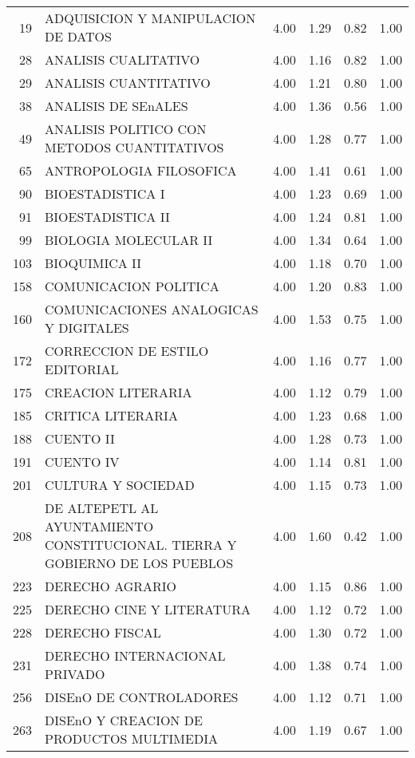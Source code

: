 \documentclass[12pt]{article}
\begin{document}
\begin{table}[ht]
\begin{tabular}{rlrrrr}
  19 & ADQUISICION Y MANIPULACION DE DATOS & 4.00 & 1.29 & 0.82 & 1.00 \\ 
  28 & ANALISIS CUALITATIVO & 4.00 & 1.16 & 0.82 & 1.00 \\ 
  29 & ANALISIS CUANTITATIVO & 4.00 & 1.21 & 0.80 & 1.00 \\ 
  38 & ANALISIS DE SEnALES & 4.00 & 1.36 & 0.56 & 1.00 \\ 
  49 & ANALISIS POLITICO CON METODOS CUANTITATIVOS & 4.00 & 1.28 & 0.77 & 1.00 \\ 
  65 & ANTROPOLOGIA FILOSOFICA & 4.00 & 1.41 & 0.61 & 1.00 \\ 
  90 & BIOESTADISTICA I & 4.00 & 1.23 & 0.69 & 1.00 \\ 
  91 & BIOESTADISTICA II & 4.00 & 1.24 & 0.81 & 1.00 \\ 
  99 & BIOLOGIA MOLECULAR II & 4.00 & 1.34 & 0.64 & 1.00 \\ 
  103 & BIOQUIMICA II & 4.00 & 1.18 & 0.70 & 1.00 \\ 
  158 & COMUNICACION POLITICA & 4.00 & 1.20 & 0.83 & 1.00 \\ 
  160 & COMUNICACIONES ANALOGICAS Y DIGITALES & 4.00 & 1.53 & 0.75 & 1.00 \\ 
  172 & CORRECCION DE ESTILO EDITORIAL & 4.00 & 1.16 & 0.77 & 1.00 \\ 
  175 & CREACION LITERARIA & 4.00 & 1.12 & 0.79 & 1.00 \\ 
  185 & CRITICA LITERARIA & 4.00 & 1.23 & 0.68 & 1.00 \\ 
  188 & CUENTO II & 4.00 & 1.28 & 0.73 & 1.00 \\ 
  191 & CUENTO IV & 4.00 & 1.14 & 0.81 & 1.00 \\ 
  201 & CULTURA Y SOCIEDAD & 4.00 & 1.15 & 0.73 & 1.00 \\ 
  208 & DE ALTEPETL AL AYUNTAMIENTO CONSTITUCIONAL. TIERRA Y GOBIERNO DE LOS PUEBLOS & 4.00 & 1.60 & 0.42 & 1.00 \\ 
  223 & DERECHO AGRARIO & 4.00 & 1.15 & 0.86 & 1.00 \\ 
  225 & DERECHO CINE Y LITERATURA & 4.00 & 1.12 & 0.72 & 1.00 \\ 
  228 & DERECHO FISCAL & 4.00 & 1.30 & 0.72 & 1.00 \\ 
  231 & DERECHO INTERNACIONAL PRIVADO & 4.00 & 1.38 & 0.74 & 1.00 \\ 
  256 & DISEnO DE CONTROLADORES & 4.00 & 1.12 & 0.71 & 1.00 \\ 
  263 & DISEnO Y CREACION DE PRODUCTOS MULTIMEDIA & 4.00 & 1.19 & 0.67 & 1.00 \\ 

\end{tabular}
\end{table}
\end{document}
